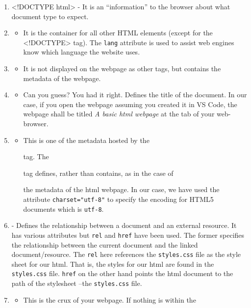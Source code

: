 \documentclass[
]{book}
\providecommand{\tightlist}{%
  \setlength{\itemsep}{0pt}\setlength{\parskip}{0pt}}
\theoremstyle{definition}
\theoremstyle{definition}
\theoremstyle{definition}
\theoremstyle{definition}
\theoremstyle{remark}
\begin{document}
\begin{enumerate}
\def\labelenumi{\arabic{enumi}.}
\item
  \textless!DOCTYPE html\textgreater{} - It is an ``information'' to the browser about what document type to expect.
\item
  \begin{itemize}
  \tightlist
  \item
    It is the container for all other HTML elements (except for the \textless!DOCTYPE\textgreater{} tag). The \texttt{lang} attribute is used to assist web engines know which language the website uses.
  \end{itemize}
\item
  \begin{itemize}
  \tightlist
  \item
    It is not displayed on the webpage as other tags, but contains the metadata of the webpage.
  \end{itemize}
\item
  \begin{itemize}
  \tightlist
  \item
    Can you guess? You had it right. Defines the title of the document. In our case, if you open the webpage assuming you created it in VS Code, the webpage shall be titled \emph{A basic html webpage} at the tab of your web-browser.
  \end{itemize}
\item
  \begin{itemize}
  \tightlist
  \item
    This is one of the metadata hosted by the

    tag. The

    tag defines, rather than contains, as in the case of

    the metadata of the html webpage. In our case, we have used the attribute \texttt{charset="utf-8"} to specify the encoding for HTML5 documents which is \texttt{utf-8}.
  \end{itemize}
\item
  - Defines the relationship between a document and an external resource. It has various attributes but \texttt{rel} and \texttt{href} have been used. The former specifies the relationship between the current document and the linked document/resource. The \texttt{rel} here references the \texttt{styles.css} file as the style sheet for our html. That is, the styles for our html are found in the \texttt{styles.css} file. \texttt{href} on the other hand points the html document to the path of the stylesheet --the \texttt{styles.css} file.
\item
  \begin{itemize}
  \tightlist
  \item
    This is the crux of your webpage. If nothing is within the


\end{itemize}
\end{enumerate}
\end{document}
